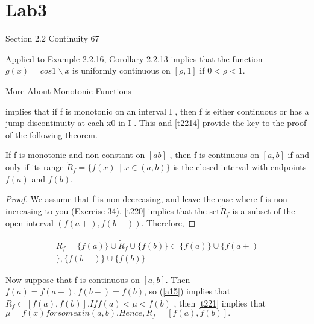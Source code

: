 \chapter{Lab3}

\begin{multicols}{2}

Section 2.2 Continuity 67

  Applied to Example 2.2.16, Corollary 2.2.13 implies that the function $g(x) =  cos1 \backslash x$  is uniformly continuous on $[\rho ,1]$ if  $0<\rho < 1.$



        More About Monotonic Functions

\begin{theorem} \label{t220}
 implies that if f is monotonic on an interval I , then f is either continuous
 or has a jump discontinuity at each x0 in I . This and \ref{t2214} provide the key to
 the proof of the following theorem.
\end{theorem}

\begin{theorem}\label{t221}
 If f is monotonic and non constant on $[a b]$ , then f is continuous on
$[a, b]$  if and only if its range  $\tilde{R} _f = \big\{f(x) \parallel x  \in(a,b)  \big\} $ is the closed interval with endpoints $f(a)$ and $f(b).$
\end{theorem}




\begin{proof}
We assume that f is non decreasing, and leave the case where f is non increasing to you (Exercise 34). \ref{t220} implies that the set$ \tilde{R}_f $
is a
subset of the open interval $(f(a+),f(b-)).$ Therefore,
\end{proof}


\begin{equation}\label{a15}
\begin{gathered}
R_f = \big\{f(a)\big\} \cup \tilde{R}_f \cup  \big\{f(b)\big\}  \subset  \big\{f(a) \big\}  \cup  \big\{f(a+)           \\ \big\},\big\{f(b-)\big\} \cup \big\{f(b)\big\}
\end{gathered}
\end{equation}

Now suppose that f is continuous on $[a,b]$. Then $f (a) = f(a+),f(b-) = f(b)$, so (\ref{a15})
implies that$ R_f \subset [f(a),f(b)].If f(a)< \mu <f(b)$ , then \ref{t221} implies that $\mu = f(x) for some x in (a, b). Hence, R_f =[f(a),f(b)].$



\end{multicols}

